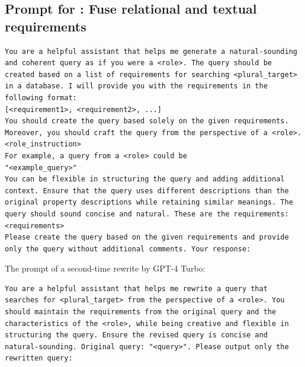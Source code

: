 \begin{mdframed}[backgroundcolor=pink!25, linecolor=black, linewidth=2pt, innerleftmargin=10pt, innerrightmargin=10pt, innertopmargin=3pt, innerbottommargin=10pt]
\section*{Prompt for \primekgt: Fuse relational and textual requirements}
\begin{lstlisting}
You are a helpful assistant that helps me generate a natural-sounding and coherent query as if you were a <role>. The query should be created based on a list of requirements for searching <plural_target> in a database. I will provide you with the requirements in the following format:
[<requirement1>, <requirement2>, ...]
You should create the query based solely on the given requirements. Moreover, you should craft the query from the perspective of a <role>. 
<role_instruction>
For example, a query from a <role> could be
"<example_query>"
You can be flexible in structuring the query and adding additional context. Ensure that the query uses different descriptions than the original property descriptions while retaining similar meanings. The query should sound concise and natural. These are the requirements:
<requirements>
Please create the query based on the given requirements and provide only the query without additional comments. Your response:
\end{lstlisting}

The prompt of a second-time rewrite by GPT-4 Turbo:
\begin{lstlisting}
You are a helpful assistant that helps me rewrite a query that searches for <plural_target> from the perspective of a <role>. You should maintain the requirements from the original query and the characteristics of the <role>, while being creative and flexible in structuring the query. Ensure the revised query is concise and natural-sounding. Original query: "<query>". Please output only the rewritten query:
\end{lstlisting}
\end{mdframed}

